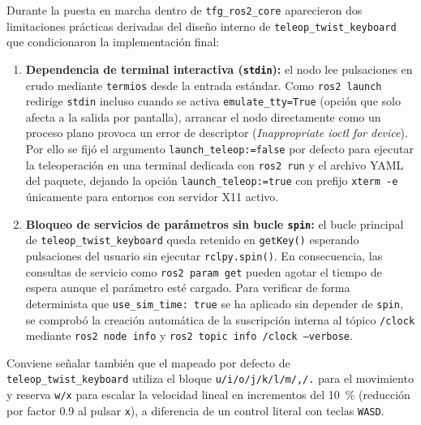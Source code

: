 Durante la puesta en marcha dentro de \texttt{tfg\_ros2\_core} aparecieron dos limitaciones prácticas derivadas del diseño interno de \texttt{teleop\_twist\_keyboard} que condicionaron la implementación final:

\begin{enumerate}
  \item \textbf{Dependencia de terminal interactiva (\texttt{stdin}):} el nodo lee pulsaciones en crudo mediante \texttt{termios} desde la entrada estándar. Como \texttt{ros2 launch} redirige \texttt{stdin} incluso cuando se activa \texttt{emulate\_tty=True} (opción que solo afecta a la salida por pantalla), arrancar el nodo directamente como un proceso plano provoca un error de descriptor (\textit{Inappropriate ioctl for device}). Por ello se fijó el argumento \texttt{launch\_teleop:=false} por defecto para ejecutar la teleoperación en una terminal dedicada con \texttt{ros2 run} y el archivo YAML del paquete, dejando la opción \texttt{launch\_teleop:=true} con prefijo \texttt{xterm -e} únicamente para entornos con servidor X11 activo.
  \item \textbf{Bloqueo de servicios de parámetros sin bucle \texttt{spin}:} el bucle principal de \texttt{teleop\_twist\_keyboard} queda retenido en \texttt{getKey()} esperando pulsaciones del usuario sin ejecutar \texttt{rclpy.spin()}. En consecuencia, las consultas de servicio como \texttt{ros2 param get} pueden agotar el tiempo de espera aunque el parámetro esté cargado. Para verificar de forma determinista que \texttt{use\_sim\_time: true} se ha aplicado sin depender de \texttt{spin}, se comprobó la creación automática de la suscripción interna al tópico \texttt{/clock} mediante \texttt{ros2 node info} y \texttt{ros2 topic info /clock --verbose}.
\end{enumerate}

Conviene señalar también que el mapeado por defecto de \texttt{teleop\_twist\_keyboard} utiliza el bloque \texttt{u/i/o/j/k/l/m/,/.} para el movimiento y reserva \texttt{w/x} para escalar la velocidad lineal en incrementos del \qty{10}{\percent} (reducción por factor \num{0.9} al pulsar \texttt{x}), a diferencia de un control literal con teclas \texttt{WASD}.


